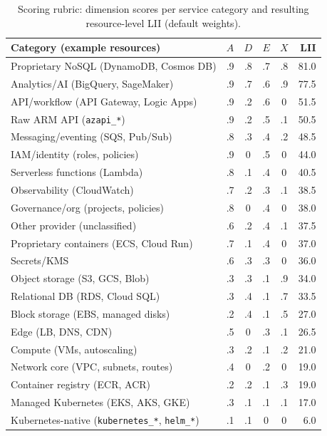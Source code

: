 \documentclass[conference]{IEEEtran}
\begin{document}
\begin{table}[t]
\caption{Scoring rubric: dimension scores per service category and resulting resource-level LII (default weights).}
\label{tab:rubric}
\centering
\footnotesize
\setlength{\tabcolsep}{3.2pt}
\begin{tabular}{@{}lccccr@{}}
\toprule
Category (example resources) & $A$ & $D$ & $E$ & $X$ & LII \\
\midrule
Proprietary NoSQL (DynamoDB, Cosmos DB) & .9 & .8 & .7 & .8 & 81.0 \\
Analytics/AI (BigQuery, SageMaker) & .9 & .7 & .6 & .9 & 77.5 \\
API/workflow (API Gateway, Logic Apps) & .9 & .2 & .6 & 0 & 51.5 \\
Raw ARM API (\texttt{azapi\_*}) & .9 & .2 & .5 & .1 & 50.5 \\
Messaging/eventing (SQS, Pub/Sub) & .8 & .3 & .4 & .2 & 48.5 \\
IAM/identity (roles, policies) & .9 & 0 & .5 & 0 & 44.0 \\
Serverless functions (Lambda) & .8 & .1 & .4 & 0 & 40.5 \\
Observability (CloudWatch) & .7 & .2 & .3 & .1 & 38.5 \\
Governance/org (projects, policies) & .8 & 0 & .4 & 0 & 38.0 \\
Other provider (unclassified) & .6 & .2 & .4 & .1 & 37.5 \\
Proprietary containers (ECS, Cloud Run) & .7 & .1 & .4 & 0 & 37.0 \\
Secrets/KMS & .6 & .3 & .3 & 0 & 36.0 \\
Object storage (S3, GCS, Blob) & .3 & .3 & .1 & .9 & 34.0 \\
Relational DB (RDS, Cloud SQL) & .3 & .4 & .1 & .7 & 33.5 \\
Block storage (EBS, managed disks) & .2 & .4 & .1 & .5 & 27.0 \\
Edge (LB, DNS, CDN) & .5 & 0 & .3 & .1 & 26.5 \\
Compute (VMs, autoscaling) & .3 & .2 & .1 & .2 & 21.0 \\
Network core (VPC, subnets, routes) & .4 & 0 & .2 & 0 & 19.0 \\
Container registry (ECR, ACR) & .2 & .2 & .1 & .3 & 19.0 \\
Managed Kubernetes (EKS, AKS, GKE) & .3 & .1 & .1 & .1 & 17.0 \\
Kubernetes-native (\texttt{kubernetes\_*}, \texttt{helm\_*}) & .1 & .1 & 0 & 0 & 6.0 \\
\bottomrule
\end{tabular}
\end{table}
\end{document}
